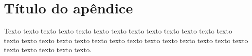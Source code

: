 \chapter{Título do apêndice}
\label{cap:ape}

Texto texto texto texto texto texto texto texto texto texto texto texto texto
texto texto texto texto texto texto texto texto texto texto texto texto texto
texto texto texto texto texto texto.

